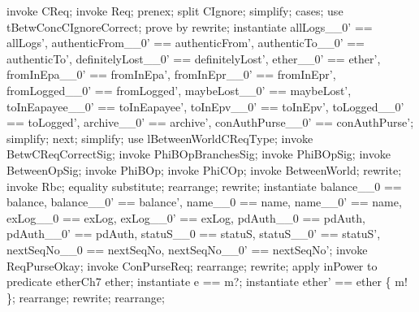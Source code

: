 \begin{LPScript}\begin{zproof}[tBetwConcCReqCorrect]
    invoke CReq;
    invoke Req;
    prenex;
    split CIgnore;
    simplify;
    cases;
        use tBetwConcCIgnoreCorrect;
        prove by rewrite;
        instantiate allLogs\_\_0' == allLogs', authenticFrom\_\_0' == authenticFrom',
            authenticTo\_\_0' == authenticTo', definitelyLost\_\_0' == definitelyLost',
            ether\_\_0' == ether', fromInEpa\_\_0' == fromInEpa',
            fromInEpr\_\_0' == fromInEpr', fromLogged\_\_0' == fromLogged',
            maybeLost\_\_0' == maybeLost', toInEapayee\_\_0' == toInEapayee',
            toInEpv\_\_0' == toInEpv', toLogged\_\_0' == toLogged',
            archive\_\_0' == archive', conAuthPurse\_\_0' == conAuthPurse';
        simplify;
    next;
        simplify;
        use lBetweenWorldCReqType;
        invoke BetwCReqCorrectSig;
        invoke PhiBOpBranchesSig;
        invoke PhiBOpSig;
        invoke BetweenOpSig;
        invoke PhiBOp;
        invoke PhiCOp;
        invoke \Delta BetweenWorld;
        rewrite;
        invoke Rbc;
        equality substitute;
        rearrange;
        rewrite;
        instantiate balance\_\_0 == balance, balance\_\_0' == balance',
            name\_\_0 == name, name\_\_0' == name, exLog\_\_0 == exLog,
            exLog\_\_0' == exLog, pdAuth\_\_0 == pdAuth, pdAuth\_\_0' == pdAuth,
            statuS\_\_0 == statuS, statuS\_\_0' == statuS',
            nextSeqNo\_\_0 == nextSeqNo, nextSeqNo\_\_0' == nextSeqNo';
        invoke ReqPurseOkay;
        invoke \Xi ConPurseReq;
        rearrange;
        rewrite;
        apply inPower to predicate etherCh7 \in \power ether;
        instantiate e == m?;
        instantiate ether' == ether \cup \{ m! \};
        rearrange;
        rewrite;
        rearrange;

\end{zproof}
\end{LPScript}
